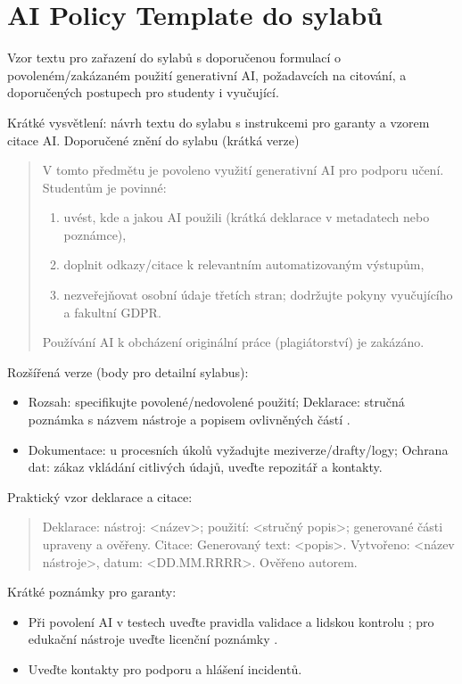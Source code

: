 \documentclass{report}%
\begin{document}
%
\section{AI Policy Template do sylabů}%
Vzor textu pro zařazení do sylabů s doporučenou formulací o povoleném/zakázaném použití generativní AI, požadavcích na citování, a doporučených postupech pro studenty i vyučující.%


%
Krátké vysvětlení: návrh textu do sylabu s instrukcemi pro garanty a vzorem citace AI.
Doporučené znění do sylabu (krátká verze)
\begin{quote}
V tomto předmětu je povoleno využití generativní AI pro podporu učení. Studentům je povinné:
\begin{enumerate}
\item uvést, kde a jakou AI použili (krátká deklarace v metadatech nebo poznámce),
\item doplnit odkazy/citace k relevantním automatizovaným výstupům,
\item nezveřejňovat osobní údaje třetích stran; dodržujte pokyny vyučujícího a fakultní GDPR.
\end{enumerate}
Používání AI k obcházení originální práce (plagiátorství) je zakázáno.
\end{quote}

Rozšířená verze (body pro detailní sylabus): \begin{itemize}
\item Rozsah: specifikujte povolené/nedovolené použití; Deklarace: stručná poznámka s názvem nástroje a popisem ovlivněných částí \cite{kb_ai_101_tipu_pdf_04e4a115_page_36_1}.
\item Dokumentace: u procesních úkolů vyžadujte meziverze/drafty/logy; Ochrana dat: zákaz vkládání citlivých údajů, uveďte repozitář a kontakty.
\end{itemize}

Praktický vzor deklarace a citace: \begin{quote}Deklarace: nástroj: <název>; použití: <stručný popis>; generované části upraveny a ověřeny. Citace: Generovaný text: <popis>. Vytvořeno: <název nástroje>, datum: <DD.MM.RRRR>. Ověřeno autorem.\end{quote}

Krátké poznámky pro garanty: \begin{itemize}
\item Při povolení AI v testech uveďte pravidla validace a lidskou kontrolu \cite{kb_ai_101_tipu_pdf_04e4a115_page_36_1}; pro edukační nástroje uveďte licenční poznámky \cite{kb_ai_101_tipu_pdf_04e4a115_page_15_2}.
\item Uveďte kontakty pro podporu a hlášení incidentů.
\end{itemize}
\end{document}
